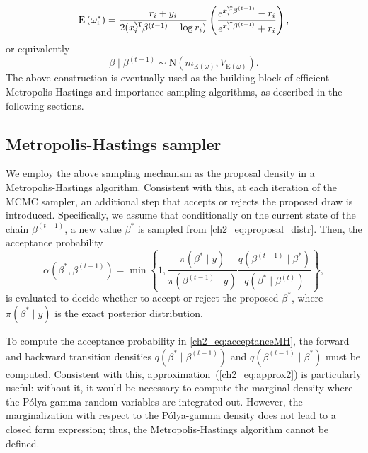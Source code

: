 \begin{equation*}
\mathrm{E}\left(\omega_i^*\right) = \frac{r_i+y_i}{2(x_i^\T\beta^{(t-1)}-\log r_i)}\left(\frac{e^{x_i^\T\beta^{(t-1)}}-r_i}{e^{x_i^\T\beta^{(t-1)}}+r_i}\right),
\end{equation*}
or equivalently
\begin{equation}
\beta\mid \beta^{(t-1)} \sim \mathrm{N}(m_{\mathrm{E}(\omega)}, V_{\mathrm{E}(\omega)}).
\label{ch2_eq:proposal_distr}
\end{equation}
The above construction is eventually used as the building block of efficient Metropolis-Hastings and importance sampling algorithms, as described in the following sections.
%

\subsection{Metropolis-Hastings sampler}
\label{ch2_sec:mh}

We employ the above sampling mechanism as the proposal density in a Metropolis-Hastings algorithm. Consistent with this, at each iteration of the MCMC sampler, an additional step that accepts or rejects the proposed draw is introduced. Specifically, we assume that conditionally on the current state of the chain $\beta^{(t-1)}$, a new value $\beta^*$ is sampled from \eqref{ch2_eq:proposal_distr}. Then, the acceptance probability 
\begin{equation}
\alpha(\beta^*,\beta^{(t-1)}) = \min\left\{ 1, \frac{\pi(\beta^*\mid y)}{\pi(\beta^{(t-1)}\mid y)}\frac{q(\beta^{(t-1)}\mid \beta^*)}{q(\beta^{*}\mid \beta^{(t)})} \right\},
\label{ch2_eq:acceptanceMH}
\end{equation}
is evaluated to decide whether to accept or reject the proposed $\beta^*$, where $\pi(\beta^*\mid y)$ is the exact posterior distribution.

%
To compute the acceptance probability in \eqref{ch2_eq:acceptanceMH}, the forward and backward transition densities $q(\beta^*\mid \beta^{(t-1)})$ and $q(\beta^{(t-1)}\mid \beta^*)$ must be computed. Consistent with this,  approximation~(\ref{ch2_eq:approx2}) is particularly useful: without it, it would be necessary to compute the marginal density where the P\'olya-gamma random variables are integrated out. However, the marginalization with respect to the  P\'olya-gamma density does not lead to a closed form expression; thus, the Metropolis-Hastings algorithm cannot be defined. %
%


